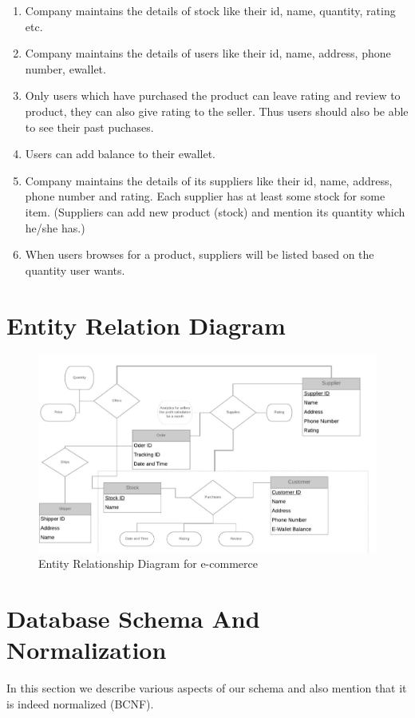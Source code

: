 \documentclass[a4paper,12pt]{article}
\begin{document}
\begin{enumerate}
\item Company maintains the details of stock like their id, name, quantity, rating etc.

\item Company maintains the details of users like their id, name, address, phone number, ewallet.

\item Only users which have purchased the product can leave rating and review to product, they can also give rating to the seller. Thus users should also be able to see their past puchases.

\item Users can add balance to their ewallet.

\item Company maintains the details of its suppliers like their id, name, address, phone number and rating. Each supplier has at least some stock for some item. (Suppliers can add new product (stock) and mention its quantity which he/she has.)

\item When users browses for a product, suppliers will be listed based on the quantity user wants.
\end{enumerate}
\section{Entity Relation Diagram}
\begin{figure}[H]
    \centering
    \includegraphics[width=1\textwidth]{ERD2} 
    \caption{Entity Relationship Diagram for e-commerce}
\end{figure}
\section{Database Schema And Normalization}
In this section we describe various aspects of our schema and also mention that it is indeed normalized (BCNF).
\end{document}
